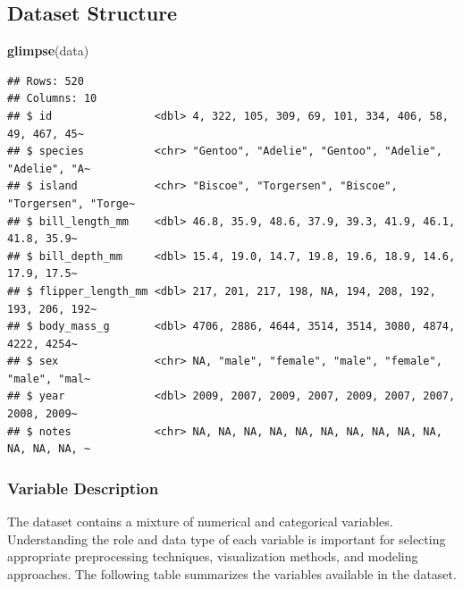 \documentclass[
]{article}
\newenvironment{Shaded}{\begin{snugshade}}{\end{snugshade}}
\newcommand{\FunctionTok}[1]{\textcolor[rgb]{0.13,0.29,0.53}{\textbf{#1}}}
\newcommand{\NormalTok}[1]{#1}
\begin{document}
\subsection{Dataset Structure}\label{dataset-structure}

\begin{Shaded}
\begin{Highlighting}[]
\FunctionTok{glimpse}\NormalTok{(data)}
\end{Highlighting}
\end{Shaded}

\begin{verbatim}
## Rows: 520
## Columns: 10
## $ id                <dbl> 4, 322, 105, 309, 69, 101, 334, 406, 58, 49, 467, 45~
## $ species           <chr> "Gentoo", "Adelie", "Gentoo", "Adelie", "Adelie", "A~
## $ island            <chr> "Biscoe", "Torgersen", "Biscoe", "Torgersen", "Torge~
## $ bill_length_mm    <dbl> 46.8, 35.9, 48.6, 37.9, 39.3, 41.9, 46.1, 41.8, 35.9~
## $ bill_depth_mm     <dbl> 15.4, 19.0, 14.7, 19.8, 19.6, 18.9, 14.6, 17.9, 17.5~
## $ flipper_length_mm <dbl> 217, 201, 217, 198, NA, 194, 208, 192, 193, 206, 192~
## $ body_mass_g       <dbl> 4706, 2886, 4644, 3514, 3514, 3080, 4874, 4222, 4254~
## $ sex               <chr> NA, "male", "female", "male", "female", "male", "mal~
## $ year              <dbl> 2009, 2007, 2009, 2007, 2009, 2007, 2007, 2008, 2009~
## $ notes             <chr> NA, NA, NA, NA, NA, NA, NA, NA, NA, NA, NA, NA, NA, ~
\end{verbatim}

\subsubsection{Variable Description}\label{variable-description}

The dataset contains a mixture of numerical and categorical variables.
Understanding the role and data type of each variable is important for
selecting appropriate preprocessing techniques, visualization methods,
and modeling approaches. The following table summarizes the variables
available in the dataset.
\end{document}
